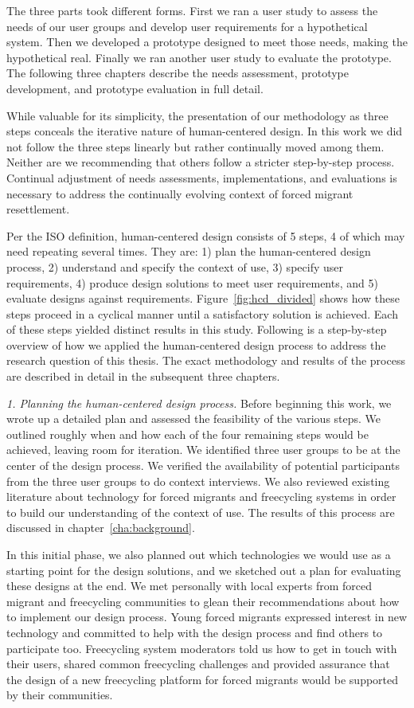 The three parts took different forms. First we ran a user study to assess the needs of our user groups and develop user requirements for a hypothetical system. Then we developed a prototype designed to meet those needs, making the hypothetical real. Finally we ran another user study to evaluate the prototype. The following three chapters describe the needs assessment, prototype development, and prototype evaluation in full detail.

While valuable for its simplicity, the presentation of our methodology as three steps conceals the iterative nature of human-centered design. In this work we did not follow the three steps linearly but rather continually moved among them. Neither are we recommending that others follow a stricter step-by-step process. Continual adjustment of needs assessments, implementations, and evaluations is necessary to address the continually evolving context of forced migrant resettlement.

Per the ISO definition, human-centered design consists of 5 steps, 4 of which may need repeating several times. They are: 1) plan the human-centered design process, 2) understand and specify the context of use, 3) specify user requirements, 4) produce design solutions to meet user requirements, and 5) evaluate designs against requirements. Figure~\ref{fig:hcd_divided} shows how these steps proceed in a cyclical manner until a satisfactory solution is achieved. Each of these steps yielded distinct results in this study. Following is a step-by-step overview of how we applied the human-centered design process to address the research question of this thesis. The exact methodology and results of the process are described in detail in the subsequent three chapters.

\textit{1. Planning the human-centered design process.} Before beginning this work, we wrote up a detailed plan and assessed the feasibility of the various steps. We outlined roughly when and how each of the four remaining steps would be achieved, leaving room for iteration. We identified three user groups to be at the center of the design process. We verified the availability of potential participants from the three user groups to do context interviews. We also reviewed existing literature about technology for forced migrants and freecycling systems in order to build our understanding of the context of use. The results of this process are discussed in chapter~\ref{cha:background}.

In this initial phase, we also planned out which technologies we would use as a starting point for the design solutions, and we sketched out a plan for evaluating these designs at the end. We met personally with local experts from forced migrant and freecycling communities to glean their recommendations about how to implement our design process. Young forced migrants expressed interest in new technology and committed to help with the design process and find others to participate too. Freecycling system moderators told us how to get in touch with their users, shared common freecycling challenges and provided assurance that the design of a new freecycling platform for forced migrants would be supported by their communities.

